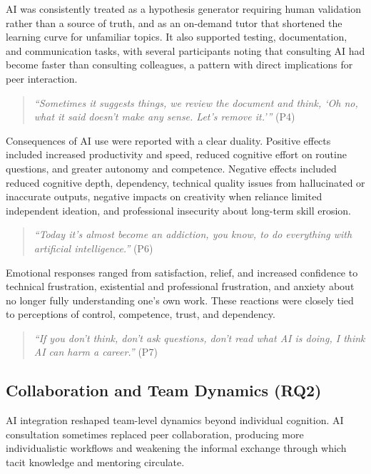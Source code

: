 \documentclass[10pt,journal,compsoc]{IEEEtran}
\begin{document}
AI was consistently treated as a hypothesis generator requiring human validation rather than a source of truth, and as an on-demand tutor that shortened the learning curve for unfamiliar topics. It also supported testing, documentation, and communication tasks, with several participants noting that consulting AI had become faster than consulting colleagues, a pattern with direct implications for peer interaction.

\begin{quote}
\textit{``Sometimes it suggests things, we review the document and think, `Oh no, what it said doesn't make any sense. Let's remove it.'\thinspace''} (P4)
\end{quote}

Consequences of AI use were reported with a clear duality. Positive effects included increased productivity and speed, reduced cognitive effort on routine questions, and greater autonomy and competence. Negative effects included reduced cognitive depth, dependency, technical quality issues from hallucinated or inaccurate outputs, negative impacts on creativity when reliance limited independent ideation, and professional insecurity about long-term skill erosion.

\begin{quote}
\textit{``Today it's almost become an addiction, you know, to do everything with artificial intelligence.''} (P6)
\end{quote}

Emotional responses ranged from satisfaction, relief, and increased confidence to technical frustration, existential and professional frustration, and anxiety about no longer fully understanding one's own work. These reactions were closely tied to perceptions of control, competence, trust, and dependency.

\begin{quote}
\textit{``If you don't think, don't ask questions, don't read what AI is doing, I think AI can harm a career.''} (P7)
\end{quote}

\subsection{Collaboration and Team Dynamics (RQ2)}
\label{sec:rq2-quotes}

AI integration reshaped team-level dynamics beyond individual cognition. AI consultation sometimes replaced peer collaboration, producing more individualistic workflows and weakening the informal exchange through which tacit knowledge and mentoring circulate.
\end{document}
